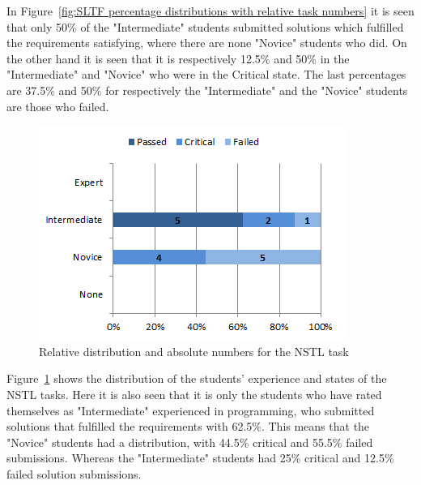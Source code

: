 \documentclass{sig-alternate-05-2015}
\begin{document}
In Figure~\ref{fig:SLTF percentage distributions with relative task numbers} it is seen that only 50\% of the "Intermediate" students submitted solutions which fulfilled the requirements satisfying, where there are none "Novice" students who did. On the other hand it is seen that it is respectively 12.5\% and 50\% in the "Intermediate" and "Novice" who were in the Critical state. The last percentages are 37.5\% and 50\% for respectively the "Intermediate" and the "Novice" students are those who failed.

\begin{figure}[!ht]
	\centering
	\includegraphics[width=1\linewidth]{img08}
	\caption{Relative distribution and absolute numbers for the NSTL task}
	\label{fig:NSTL percentage distributions with relative task numbers}
\end{figure}

Figure~\ref{fig:NSTL percentage distributions with relative task numbers} shows the distribution of the students' experience and states of the NSTL tasks. Here it is also seen that it is only the students who have rated themselves as "Intermediate" experienced in programming, who submitted solutions that fulfilled the requirements with 62.5\%. This means that the "Novice" students had a distribution, with 44.5\% critical and 55.5\% failed submissions. Whereas the "Intermediate" students had 25\% critical and 12.5\% failed solution submissions.
\end{document}
